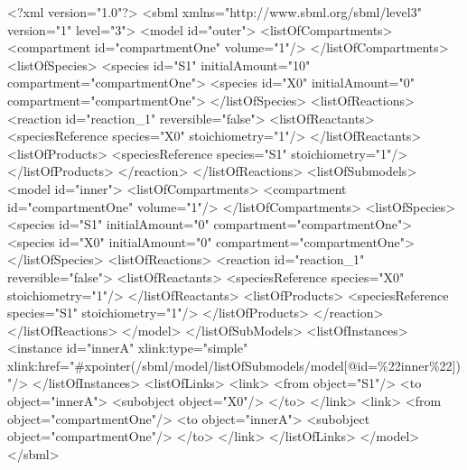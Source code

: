 \documentclass{cekarticle}
\begin{document}
\begin{example}
<?xml version="1.0"?>
<sbml xmlns="http://www.sbml.org/sbml/level3" version="1" level="3">
    <model id="outer">
        <listOfCompartments>
            <compartment id="compartmentOne" volume="1"/>
        </listOfCompartments>
        <listOfSpecies>
            <species id="S1" initialAmount="10" compartment="compartmentOne">
            <species id="X0" initialAmount="0" compartment="compartmentOne">
        </listOfSpecies>
        <listOfReactions>
            <reaction id="reaction_1" reversible="false">
                <listOfReactants>
                    <speciesReference species="X0" stoichiometry="1"/>
                </listOfReactants>
                <listOfProducts>
                    <speciesReference species="S1" stoichiometry="1"/>
                </listOfProducts>
            </reaction>
        </listOfReactions>
        <listOfSubmodels>
            <model id="inner">
                <listOfCompartments>
                    <compartment id="compartmentOne" volume="1"/>
                </listOfCompartments>
                <listOfSpecies>
                    <species id="S1" initialAmount="0" compartment="compartmentOne">
                    <species id="X0" initialAmount="0" compartment="compartmentOne">
                </listOfSpecies>
                <listOfReactions>
                    <reaction id="reaction_1" reversible="false">
                        <listOfReactants>
                            <speciesReference species="X0" stoichiometry="1"/>
                        </listOfReactants>
                        <listOfProducts>
                            <speciesReference species="S1" stoichiometry="1"/>
                        </listOfProducts>
                    </reaction>
                </listOfReactions>
            </model>
        </listOfSubModels>
        <listOfInstances>
            <instance
                id="innerA" 
                xlink:type="simple"
                xlink:href="#xpointer(/sbml/model/listOfSubmodels/model[@id=\%22inner\%22])"/>
        </listOfInstances>
        <listOfLinks>
            <link>
                <from object="S1"/>
                <to object="innerA">
                    <subobject object="X0"/>
                </to>
            </link>
            <link>
                <from object="compartmentOne"/>
                <to object="innerA">
                    <subobject object="compartmentOne"/>
                </to>
            </link>
        </listOfLinks>
    </model>
</sbml>
\end{example}
\end{document}
